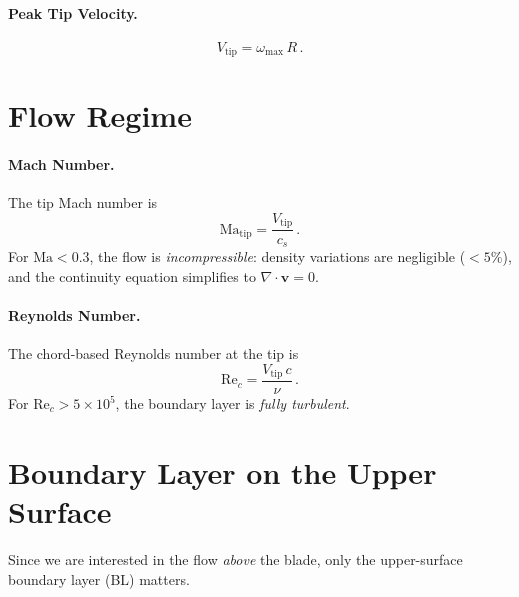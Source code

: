 \documentclass[11pt,a4paper]{article}
\begin{document}
\paragraph{Peak Tip Velocity.}
\begin{equation}
  V_\mathrm{tip} = \omega_\mathrm{max}\,R\,.
  \label{eq:Vtip}
\end{equation}


\section{Flow Regime}
\label{sec:regime}

\paragraph{Mach Number.}
The tip Mach number is
\begin{equation}
  \mathrm{Ma}_\mathrm{tip}
    = \frac{V_\mathrm{tip}}{c_s}\,.
  \label{eq:Mach}
\end{equation}
For $\mathrm{Ma} < 0.3$, the flow is \emph{incompressible}: density
variations are negligible ($< 5\%$), and the continuity equation
simplifies to $\nabla \cdot \mathbf{v} = 0$.

\paragraph{Reynolds Number.}
The chord-based Reynolds number at the tip is
\begin{equation}
  \mathrm{Re}_c = \frac{V_\mathrm{tip}\,c}{\nu}\,.
  \label{eq:Re}
\end{equation}
For $\mathrm{Re}_c > 5 \times 10^5$, the boundary layer is
\emph{fully turbulent}.


\section{Boundary Layer on the Upper Surface}
\label{sec:BL}

Since we are interested in the flow \emph{above} the blade, only the
upper-surface boundary layer (BL) matters.
\end{document}
